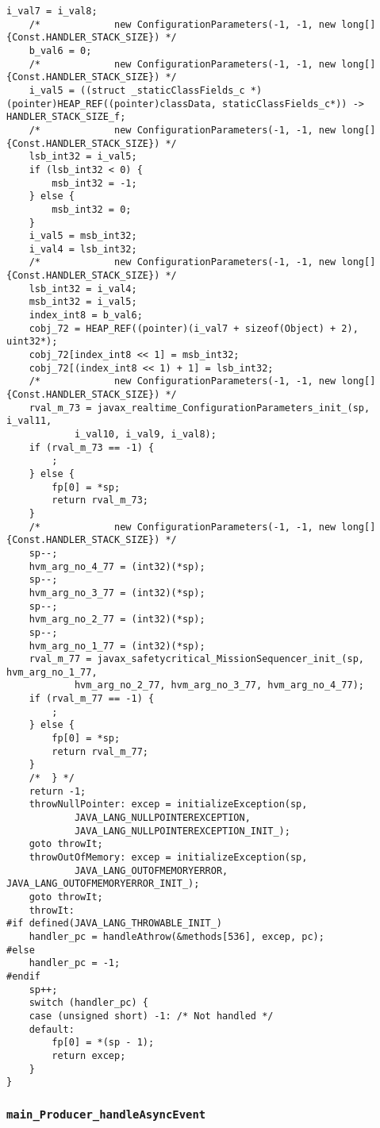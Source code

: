 \begin{lstlisting}[firstnumber=55976]
	i_val7 = i_val8;
	/*			   new ConfigurationParameters(-1, -1, new long[] {Const.HANDLER_STACK_SIZE}) */
	b_val6 = 0;
	/*			   new ConfigurationParameters(-1, -1, new long[] {Const.HANDLER_STACK_SIZE}) */
	i_val5 = ((struct _staticClassFields_c *)(pointer)HEAP_REF((pointer)classData, staticClassFields_c*)) -> HANDLER_STACK_SIZE_f;
	/*			   new ConfigurationParameters(-1, -1, new long[] {Const.HANDLER_STACK_SIZE}) */
	lsb_int32 = i_val5;
	if (lsb_int32 < 0) {
		msb_int32 = -1;
	} else {
		msb_int32 = 0;
	}
	i_val5 = msb_int32;
	i_val4 = lsb_int32;
	/*			   new ConfigurationParameters(-1, -1, new long[] {Const.HANDLER_STACK_SIZE}) */
	lsb_int32 = i_val4;
	msb_int32 = i_val5;
	index_int8 = b_val6;
	cobj_72 = HEAP_REF((pointer)(i_val7 + sizeof(Object) + 2), uint32*);
	cobj_72[index_int8 << 1] = msb_int32;
	cobj_72[(index_int8 << 1) + 1] = lsb_int32;
	/*			   new ConfigurationParameters(-1, -1, new long[] {Const.HANDLER_STACK_SIZE}) */
	rval_m_73 = javax_realtime_ConfigurationParameters_init_(sp, i_val11,
			i_val10, i_val9, i_val8);
	if (rval_m_73 == -1) {
		;
	} else {
		fp[0] = *sp;
		return rval_m_73;
	}
	/*			   new ConfigurationParameters(-1, -1, new long[] {Const.HANDLER_STACK_SIZE}) */
	sp--;
	hvm_arg_no_4_77 = (int32)(*sp);
	sp--;
	hvm_arg_no_3_77 = (int32)(*sp);
	sp--;
	hvm_arg_no_2_77 = (int32)(*sp);
	sp--;
	hvm_arg_no_1_77 = (int32)(*sp);
	rval_m_77 = javax_safetycritical_MissionSequencer_init_(sp, hvm_arg_no_1_77,
			hvm_arg_no_2_77, hvm_arg_no_3_77, hvm_arg_no_4_77);
	if (rval_m_77 == -1) {
		;
	} else {
		fp[0] = *sp;
		return rval_m_77;
	}
	/*	} */
	return -1;
	throwNullPointer: excep = initializeException(sp,
			JAVA_LANG_NULLPOINTEREXCEPTION,
			JAVA_LANG_NULLPOINTEREXCEPTION_INIT_);
	goto throwIt;
	throwOutOfMemory: excep = initializeException(sp,
			JAVA_LANG_OUTOFMEMORYERROR, JAVA_LANG_OUTOFMEMORYERROR_INIT_);
	goto throwIt;
	throwIt:
#if defined(JAVA_LANG_THROWABLE_INIT_)
	handler_pc = handleAthrow(&methods[536], excep, pc);
#else
	handler_pc = -1;
#endif
	sp++;
	switch (handler_pc) {
	case (unsigned short) -1: /* Not handled */
	default:
		fp[0] = *(sp - 1);
		return excep;
	}
}
\end{lstlisting}

\subsubsection{\texttt{main\_Producer\_handleAsyncEvent}}

